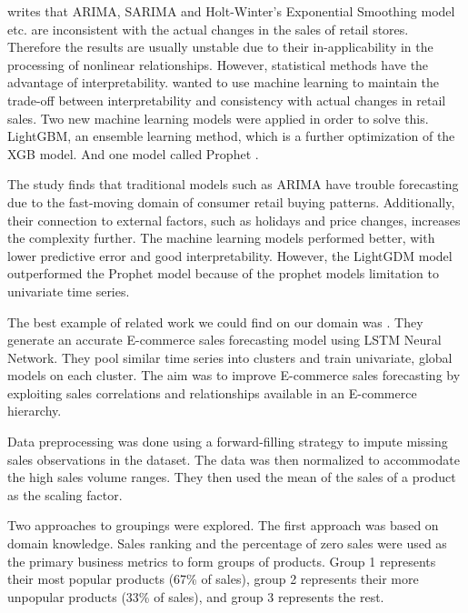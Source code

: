 \cite{Weng2020} writes that ARIMA, SARIMA and Holt-Winter's
Exponential Smoothing model etc. are inconsistent with the actual changes in the sales
of retail stores.
Therefore the results are usually unstable due to their in-applicability
in the processing of nonlinear relationships.
However, statistical methods have the advantage of interpretability.
\cite{Bowen2020} wanted to use machine learning to maintain
the trade-off between interpretability and consistency with actual
changes in retail sales.
Two new machine learning models were applied in order to solve this.
LightGBM, an ensemble learning method, which is a further optimization of the XGB model.
And one model called Prophet \citep{Zunic2020}.

The study finds that traditional models such as ARIMA have trouble forecasting
due to the fast-moving domain of consumer retail buying patterns.
Additionally, their connection to external factors,
such as holidays and price changes, increases the complexity further.
The machine learning models performed better, with lower predictive error
and good interpretability.
However, the LightGDM model outperformed the Prophet model because of the prophet
models limitation to univariate time series.



The best example of related work we could find on our domain was
\cite{Bandara2019}.
They generate an accurate E-commerce sales forecasting model using LSTM  Neural Network.
They pool similar time series into clusters and train univariate, global models on each cluster.
The aim was to improve E-commerce sales forecasting by exploiting sales correlations and relationships
available in an E-commerce hierarchy.

Data preprocessing was done using a forward-filling strategy to impute missing sales
observations in the dataset.
The data was then normalized to accommodate the high sales volume ranges.
They then used the mean of the sales of a product as the scaling factor.

Two approaches to groupings were explored.
The first approach was based on domain knowledge.
Sales ranking and the percentage of zero sales were used as the primary business metrics
to form groups of products.
Group 1 represents their most popular products (67\% of sales), group 2 represents
their more unpopular products (33\% of sales), and group 3 represents the rest.

